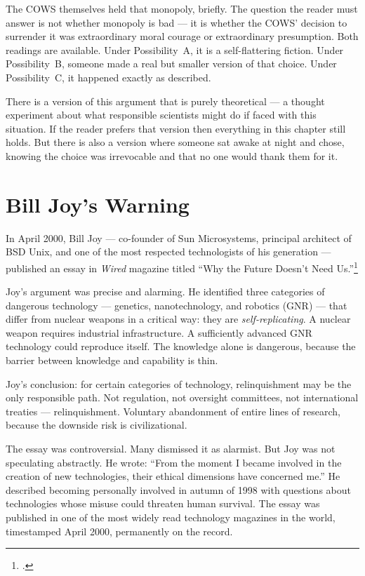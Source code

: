 The COWS themselves held that monopoly, briefly. The question the reader must answer is not whether monopoly is bad --- it is whether the COWS' decision to surrender it was extraordinary moral courage or extraordinary presumption. Both readings are available. Under Possibility~A, it is a self-flattering fiction. Under Possibility~B, someone made a real but smaller version of that choice. Under Possibility~C, it happened exactly as described.

There is a version of this argument that is purely theoretical --- a thought experiment about what responsible scientists might do if faced with this situation. If the reader prefers that version then everything in this chapter still holds. But there is also a version where someone sat awake at night and chose, knowing the choice was irrevocable and that no one would thank them for it.

\section*{Bill Joy's Warning}
\label{pos06:bill-joys-warning}

In April 2000, Bill Joy --- co-founder of Sun Microsystems, principal architect of BSD Unix, and one of the most respected technologists of his generation --- %
published an essay in \textit{Wired} magazine titled ``Why the Future Doesn't Need Us.''\footcite{joy2000}

Joy's argument was precise and alarming. He identified three categories of dangerous technology --- genetics, nanotechnology, and robotics (GNR) --- that differ from nuclear weapons in a critical way: they are \textit{self-replicating}. A nuclear weapon requires industrial infrastructure. A sufficiently advanced GNR technology could reproduce itself. The knowledge alone is dangerous, because the barrier between knowledge and capability is thin.

Joy's conclusion: for certain categories of technology, relinquishment may be the only responsible path. Not regulation, not oversight committees, not international treaties --- relinquishment. Voluntary abandonment of entire lines of research, because the downside risk is civilizational.

The essay was controversial. Many dismissed it as alarmist. But Joy was not speculating abstractly. He wrote: ``From the moment I became involved in the creation of new technologies, their ethical dimensions have concerned me.'' He described becoming personally involved in autumn of 1998 with questions about technologies whose misuse could threaten human survival. The essay was published in one of the most widely read technology magazines in the world, timestamped April 2000, permanently on the record.

